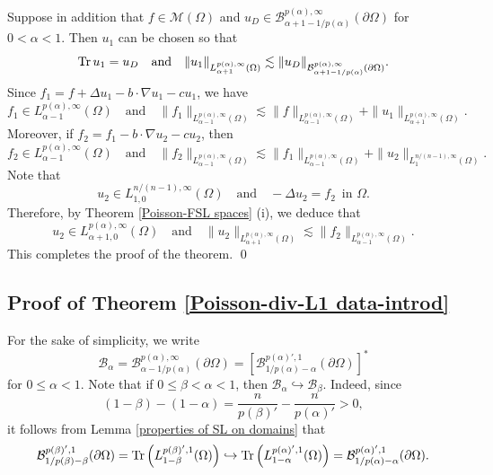 \documentclass[reqno,centertags,11pt]{amsart}
\theoremstyle{definition}
\numberwithin{thm}{section}
\numberwithin{equation}{section}
\begin{document}
Suppose in addition that $ f\in \mathcal{M}  (\Omega )$ and $u_D \in \mathcal B^{p(\alpha ),\infty}_{\alpha +1 -1/p (\alpha )}(\partial \Omega )$ for   $0 <  \alpha <1$. Then $u_1$ can be chosen so that
\[
{\rm Tr}\, u_1 = u_D \quad\mbox{and}\quad \|u_1 \|_{L_{\alpha+1}^{p(\alpha),\infty}(\Omega )} \lesssim  \|u_D \|_{\mathcal B^{p(\alpha ),\infty}_{\alpha +1 -1/p (\alpha )}(\partial \Omega )}.
\]
Since  $f_1 = f+  \Delta u_1 -b\cdot \nabla u_1 -cu_1$, we have
\[
f_1 \in L_{\alpha-1}^{p(\alpha),\infty}(\Omega )\quad\mbox{and}\quad \|f_1 \|_{L_{\alpha-1}^{p(\alpha),\infty}(\Omega )} \lesssim   \|f\|_{L_{\alpha-1}^{p(\alpha),\infty}(\Omega )} + \|u_1 \|_{L_{\alpha+1}^{p(\alpha),\infty}(\Omega )}  .
\]
Moreover, if $f_2 = f_1 -b\cdot \nabla u_2 -cu_2$, then
\[
f_2 \in L_{\alpha-1}^{p(\alpha),\infty}(\Omega )\quad\mbox{and}\quad \|f_2 \|_{L_{\alpha-1}^{p(\alpha),\infty}(\Omega )} \lesssim   \|f_1 \|_{L_{\alpha-1}^{p(\alpha),\infty}(\Omega )} + \|u_2 \|_{L_1^{n/(n-1),\infty}(\Omega  )}  .
\]
Note that
$$
u_2 \in L_{1, 0}^{n/(n-1),\infty}(\Omega )\quad\mbox{and}\quad - \Delta u_2 = f_2 \,\,\,\mbox{in}\,\,\Omega.
$$
Therefore, by Theorem \ref{Poisson-FSL spaces} (i), we deduce that
\[
 u_2 \in L_{\alpha+1,0}^{p(\alpha) ,\infty}(\Omega)  \quad\mbox{and}\quad \| u_2 \|_{L_{\alpha+1}^{p(\alpha),\infty}(\Omega )}  \lesssim \|f_2 \|_{L_{\alpha-1}^{p(\alpha),\infty}(\Omega )}.
\]
This completes the proof of the theorem.
\qed



\subsection{Proof  of Theorem  \ref{Poisson-div-L1 data-introd}}


For the sake of simplicity, we write
$$
\mathcal{B}_\alpha = \mathcal{B}_{\alpha  - 1/p(\alpha)}^{p(\alpha ),\infty}(\partial\Omega ) = \left[ \mathcal{B}_{  1/p(\alpha)-\alpha}^{p(\alpha ) ' ,
1}(\partial\Omega ) \right]^*
$$
for $0 \le \alpha < 1$. Note that if $0 \le \beta <  \alpha < 1$, then $\mathcal{B}_\alpha \hookrightarrow \mathcal{B}_\beta$. Indeed,  since
 $$
(1-\beta)- (1-\alpha) = \frac{n}{p(\beta)'} -\frac{n}{p(\alpha)'} >0 ,
$$
it follows from Lemma \ref{properties of SL on domains} that
\[
\mathcal{B}_{  1/p(\beta)-\beta}^{p(\beta ) ' ,1}(\partial\Omega ) = {\rm Tr} \left(L_{1-\beta}^{p(\beta)' , 1}(\Omega )\right) \hookrightarrow {\rm Tr} \left(L_{1-\alpha}^{p(\alpha)' , 1}(\Omega )\right) =
\mathcal{B}_{  1/p(\alpha)-\alpha}^{p(\alpha ) ' ,1}(\partial\Omega ).
\]
\end{document}
